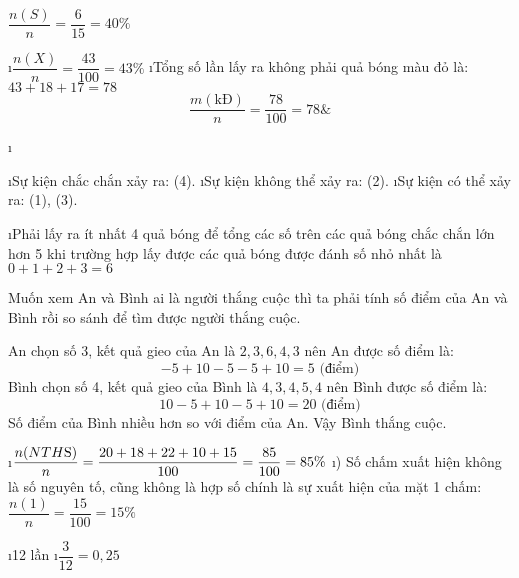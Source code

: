 \begin{Answer}{8}
		$\dfrac{{n(S)}}{n} = \dfrac{6}{{15}} = 40\% $
	
\end{Answer}
\begin{Answer}{9}
		\begin{enumerate}[a),leftmargin=*]
			\i $\dfrac{{n(X)}}{n} = \dfrac{{43}}{{100}} = 43\% $
			\i Tổng số lần lấy ra không phải quả bóng màu đỏ là: $43 + 18 + 17 = 78$
			\[\dfrac{m(\text{kĐ})}{n} = \dfrac{78}{100} = 78\&\]
		\end{enumerate}
	
\end{Answer}
\begin{Answer}{10}
		\begin{enumerate}[a),leftmargin=*]
			\i \begin{enumerate}[--,leftmargin=*]
				\i Sự kiện chắc chắn xảy ra: (4).
				\i Sự kiện không thể xảy ra: (2).
				\i Sự kiện có thể xảy ra: (1), (3).
			\end{enumerate}
			\i Phải lấy ra ít nhất 4 quả bóng để tổng các số trên các quả bóng chắc chắn lớn hơn 5 khi trường hợp lấy được các quả bóng được đánh số nhỏ nhất là  $0 + 1 + 2 + 3 = 6$
		\end{enumerate}
	
\end{Answer}
\begin{Answer}{11}
		Muốn xem An và Bình ai là người thắng cuộc thì ta phải tính số điểm của An và Bình rồi so sánh để tìm được người thắng cuộc.
		
		An chọn số 3, kết quả gieo của An là $2,3,6,4,3$ nên An được số điểm là:
		\[ - 5 + 10 - 5 - 5 + 10 = 5 \text{ (điểm)}\]
		Bình chọn số 4, kết quả gieo của Bình là $4,3,4,5,4$ nên Bình được số điểm là:
		\[10 - 5 + 10 - 5 + 10 = 20 \text{ (điểm)}\]
		Số điểm của Bình nhiều hơn so với điểm của An. Vậy Bình thắng cuộc.
	
\end{Answer}
\begin{Answer}{12}
		\begin{enumerate}[a),leftmargin=*]
			\i $\dfrac{{n(NTH{\rm{S}})}}{n} = \dfrac{{20 + 18 + 22 + 10 + 15}}{{100}} = \dfrac{{85}}{{100}} = 85\% $
			\i ) Số chấm xuất hiện không là số nguyên tố, cũng không là hợp số chính là sự xuất hiện của mặt 1 chấm: $\dfrac{{n(1)}}{n} = \dfrac{{15}}{{100}} = 15\%$
		\end{enumerate}
	
\end{Answer}
\begin{Answer}{13}
		\begin{enumerate}[a),leftmargin=*]
			\i 12 lần
			\i $\dfrac{3}{12} = 0,25$
		\end{enumerate}
	
\end{Answer}
